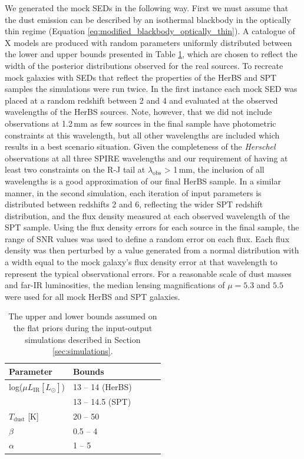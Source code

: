 We generated the mock SEDs in the following way. First we must assume that the dust emission can be described by an isothermal blackbody in the optically thin regime (Equation \ref{eq:modified_blackbody_optically_thin}). A catalogue of {\color{red} X} models are produced with random parameters uniformly distributed between the lower and upper bounds presented in Table \ref{tab:simulation_inputs}, which are chosen to reflect the width of the posterior distributions observed for the real sources. To recreate mock galaxies with SEDs that reflect the properties of the HerBS and SPT samples the simulations were run twice. In the first instance each mock SED was placed at a random redshift between 2 and 4 and evaluated at the observed wavelengths of the HerBS sources. Note, however, that we did not include observations at 1.2\,mm as few sources in the final sample have photometric constraints at this wavelength, but all other wavelengths are included which results in a best scenario situation. Given the completeness of the \textit{Herschel} observations at all three SPIRE wavelengths and our requirement of having at least two constraints on the R-J tail at $\lambda_{\textrm{obs}}$ > 1\,mm, the inclusion of all wavelengths is a good approximation of our final HerBS sample. In a similar manner, in the second simulation, each iteration of input parameters is distributed between redshifts 2 and 6, reflecting the wider SPT redshift distribution, and the flux density measured at each observed wavelength of the SPT sample. Using the flux density errors for each source in the final sample, the range of SNR values was used to define a random error on each flux. Each flux density was then perturbed by a value generated from a normal distribution with a width equal to the mock galaxy's flux density error at that wavelength to represent the typical observational errors. For a reasonable scale of dust masses and far-IR luminosities, the median lensing magnifications of $\mu = 5.3$ and $5.5$ were used for all mock HerBS and SPT galaxies.

\begin{table}
    \centering
    \begin{tabular}{|p{3cm}|p{3cm}|p{3cm}|p{3cm}|p{3cm}|}
        \hline
        Parameter & Bounds \\
        \hline
        \hline
        log($\mu L_{\textrm{IR}} [L_{\odot}]$) & 13 -- 14 (HerBS) \\
        & 13 -- 14.5 (SPT) \\
		$T_{\textrm{dust}}$ [K] & 20 -- 50 \\
		$\beta$  & 0.5 -- 4 \\
		$\alpha$  & 1 -- 5 \\
        \hline
    \end{tabular}
    \caption{The upper and lower bounds assumed on the flat priors during the input-output simulations described in Section \ref{sec:simulations}.}
    \label{tab:simulation_inputs}
\end{table}

